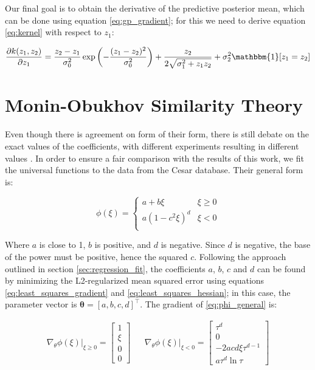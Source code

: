 \documentclass[a4paper]{book}
\begin{document}
Our final goal is to obtain the derivative of the predictive posterior mean, which can be done using equation \ref{eq:gp_gradient}; for this we need to derive equation \ref{eq:kernel} with respect to $z_1$:

\begin{equation}
\label{eq:kernel_derivative}
\frac{\partial k(z_1,z_2)}{\partial z_1}=\frac{z_2-z_1}{\sigma_0^2}\exp\left(-\frac{(z_1-z_2)^2}{\sigma_0^2}\right)+\frac{z_2}{2\sqrt{\sigma_1^2+z_1z_2}}+\sigma_2^2\mathbbm{1}[z_1=z_2]
\end{equation}



\section{Monin-Obukhov Similarity Theory}
\label{sec:most_fit}

Even though there is agreement on form of their form, there is still debate on the exact values of the coefficients, with different experiments resulting in different values \citep{hogstrom88}. In order to ensure a fair comparison with the results of this work, we fit the universal functions to the data from the Cesar database. Their general form is:

\begin{equation}
\label{eq:phi_general}
\phi(\xi)=\begin{cases}
a+b\xi & \xi\geq 0 \\
a(1-c^2\xi)^d & \xi<0 \\
\end{cases}
\end{equation}

Where $a$ is close to 1, $b$ is positive, and $d$ is negative. Since $d$ is negative, the base of the power must be positive, hence the squared $c$. Following the approach outlined in section \ref{sec:regression_fit}, the coefficients $a$, $b$, $c$ and $d$ can be found by minimizing the L2-regularized mean squared error using equations \ref{eq:least_squares_gradient} and \ref{eq:least_squares_hessian}; in this case, the parameter vector is $\bm\theta=\left[a,b,c,d\right]^\intercal$. The gradient of \ref{eq:phi_general} is:


\begin{align}
\nabla_\theta\phi(\xi)\vert_{\xi\geq 0}=\begin{bmatrix}
1 \\ \xi \\ 0 \\ 0
\end{bmatrix} &&
\nabla_\theta\phi(\xi)\vert_{\xi<0}=\begin{bmatrix}
\tau^d \\ 0 \\ -2acd\xi\tau^{d-1} \\ a\tau^d\ln\tau
\end{bmatrix}
\end{align}
\end{document}

